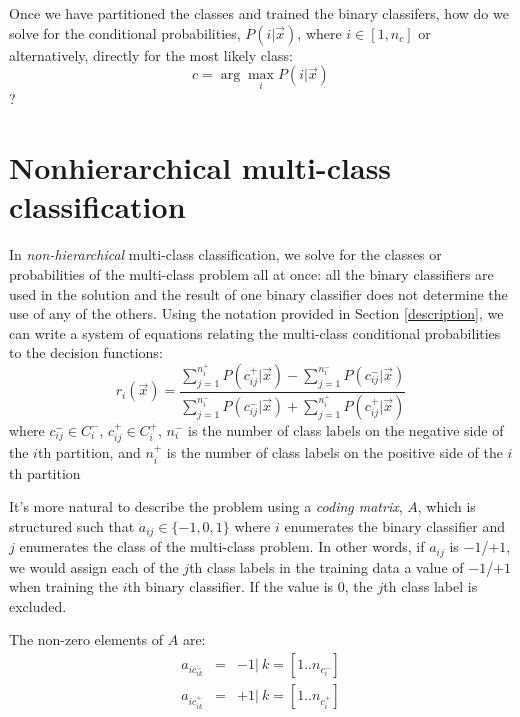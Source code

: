 \documentclass{article}
\begin{document}
Once we have partitioned the classes
and trained the binary classifers,
how do we solve for the conditional probabilities, $P(i|\vec x)$,
where $i \in [1,n_c]$
or alternatively, directly for the most likely class:
\begin{equation}
	c=\arg \max_i P(i | \vec x)
\end{equation}
?

\section{Nonhierarchical multi-class classification}

In {\it non-hierarchical} multi-class classification, we solve for the
classes or probabilities of the multi-class problem all at once:
all the binary classifiers are used in the solution and the result of
one binary classifier does not determine the use of any of the others.
Using the notation provided in Section \ref{description}, 
we can write a system of equations relating
the multi-class conditional probabilities to the decision
functions:
\begin{equation}
	r_i(\vec x) = \frac{\sum_{j=1}^{n_i^+} P(c_{ij}^+|\vec x) - \sum_{j=1}^{n_{i}^-} P(c_{ij}^-|\vec x)}{\sum_{j=1}^{n_i^-} P(c_{ij}^-|\vec x) + \sum_{j=1}^{n_i^+} P(c_{ij}^+|\vec x)}
	\label{decision_function}
\end{equation}
where 
$c_{ij}^- \in C_i^-$,
$c_{ij}^+ \in C_i^+$,
$n_i^-$ is the number of class labels on the negative side of
the $i$th partition,
and $n_i^+$ is the number of class labels on the positive side of
the $i$th partition

It's more natural to describe the problem using a
{\it coding matrix}, $A$, 
which is structured such that
$a_{ij} \in \lbrace -1, 0, 1 \rbrace$ where $i$ enumerates the binary classifier and
$j$ enumerates the class of the multi-class problem.
In other words, if $a_{ij}$ is $-1$/$+1$, we would assign each of the $j$th class
labels in the training data a value of $-1$/$+1$ when training the $i$th
binary classifier. If the value is $0$, the $j$th class label is excluded.

The non-zero elements of $A$ are:
\begin{eqnarray}
	a_{ic_{ik}^-} & = & -1 | ~k = [1..n_{c_i^-}]\\
a_{ic_{ik}^+} & = & +1 | ~k=[1..n_{c_i^+}]
\end{eqnarray}
\end{document}

